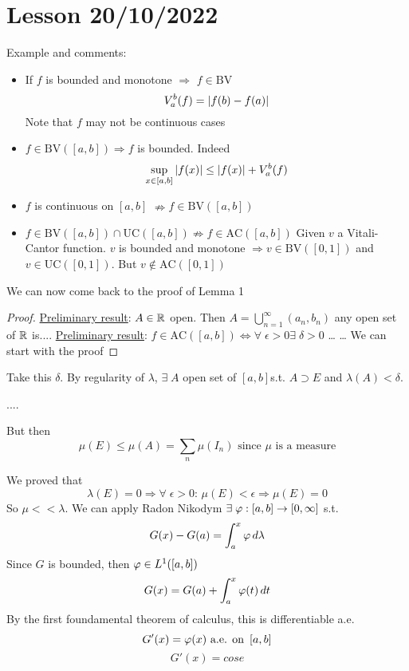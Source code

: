 \section{Lesson 20/10/2022}
Example and comments:
\begin{itemize}
    \item If \(f\) is bounded and monotone \(\Longrightarrow\) \(f \in \mbox{BV}\)
    \[
        V_a^b (f) = \abs{f(b) - f(a)}
    \]
    Note that \(f\) may not be continuous
    cases
    \item \(f \in \mbox{BV}([a,b]) \Longrightarrow f\) is bounded. Indeed
    \[
        \sup_{x \in [a,b]} \abs{f(x)} \leq \abs{f(x)} + V_a^b(f)
    \]
    \item \(f\) is continuous on \([a,b]\) \(\nRightarrow f \in \mbox{BV}([a,b])\)
    \item \(f \in \mbox{BV}([a,b]) \cap \mbox{UC}([a,b])  \nRightarrow f \in \mbox{AC}([a,b])\)
    Given \(v\) a Vitali-Cantor function. \(v\) is bounded and monotone \(\Longrightarrow v \in \mbox{BV}([0,1])\) and \(v \in \mbox{UC}([0,1])\). But \(v \not \in \mbox{AC}([0,1])\)
\end{itemize}
We can now come back to the proof of Lemma 1
\begin{proof}
    \underline{Preliminary result}: \(A \in \mathbb{R}\) open. Then \(A = \bigcup_{n=1}^{\infty}(a_n, b_n)\)
    any open set of \(\mathbb{R}\) is....
    \underline{Preliminary result}: \(f \in \mbox{AC}([a,b]) \Longleftrightarrow \forall \; \epsilon > 0 \exists \; \delta > 0\)
    \dots
    \dots
    We can start with the proof
\end{proof}

Take this \(\delta\). By regularity of \(\lambda\), \(\exists \; A \) open set of \(\left[a, b\right]\)s.t. \(A \supset E\) and \(\lambda(A) < \delta\). 

....

But then 
\[
    \mu (E) \leq \mu(A) = \sum_n \mu (I_n) \text{ since } \mu \text{ is a measure}
\]

We proved that 
\[
    \lambda(E) = 0 \Rightarrow \forall \; \epsilon >0 : \, \mu(E) < \epsilon \Rightarrow \mu(E) =0
\]
So \(\mu << \lambda\). We can apply Radon Nikodym \(\exists \; \oldphi : \left[ a, b\right] \to \left[0, \infty\right]\) s.t. 
\[
    G(x) - G(a) = \int_a^x \oldphi \, d\lambda
\]
Since \(G\) is bounded, then \(\oldphi \in L^1(\left[a, b\right])\)
\[
    G(x)=G(a) + \int_a^x \oldphi(t) \, dt
\]
By the first foundamental theorem of calculus, this is differentiable a.e. 
\[
    G'(x) = \oldphi(x) \text{ a.e. on } \left[a, b\right]
\]
\[
    G'(x) = cose
\]

